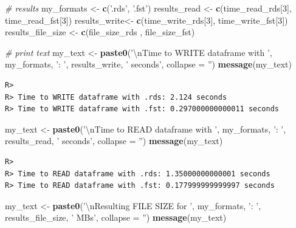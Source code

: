\documentclass[
  12pt,
]{book}
\newenvironment{Shaded}{\begin{snugshade}}{\end{snugshade}}
\newcommand{\CharTok}[1]{\textcolor[rgb]{0.5,0.5,0.5}{#1}}
\newcommand{\CommentTok}[1]{\textcolor[rgb]{0.37,0.37,0.37}{\textit{#1}}}
\newcommand{\DataTypeTok}[1]{\textcolor[rgb]{0.27,0.27,0.27}{#1}}
\newcommand{\DecValTok}[1]{\textcolor[rgb]{0.06,0.06,0.06}{#1}}
\newcommand{\KeywordTok}[1]{\textcolor[rgb]{0.27,0.27,0.27}{\textbf{#1}}}
\newcommand{\NormalTok}[1]{#1}
\newcommand{\StringTok}[1]{\textcolor[rgb]{0.5,0.5,0.5}{#1}}
\begin{document}
\begin{Shaded}
\begin{Highlighting}[]
\CommentTok{# results}
\NormalTok{my_formats <-}\StringTok{ }\KeywordTok{c}\NormalTok{(}\StringTok{'.rds'}\NormalTok{, }\StringTok{'.fst'}\NormalTok{)}
\NormalTok{results_read <-}\StringTok{ }\KeywordTok{c}\NormalTok{(time_read_rds[}\DecValTok{3}\NormalTok{], time_read_fst[}\DecValTok{3}\NormalTok{])}
\NormalTok{results_write<-}\StringTok{ }\KeywordTok{c}\NormalTok{(time_write_rds[}\DecValTok{3}\NormalTok{], time_write_fst[}\DecValTok{3}\NormalTok{])}
\NormalTok{results_file_size <-}\StringTok{ }\KeywordTok{c}\NormalTok{(file_size_rds , file_size_fst)}

\CommentTok{# print text}
\NormalTok{my_text <-}\StringTok{ }\KeywordTok{paste0}\NormalTok{(}\StringTok{'}\CharTok{\textbackslash{}n}\StringTok{Time to WRITE dataframe with '}\NormalTok{,}
\NormalTok{                  my_formats, }\StringTok{': '}\NormalTok{,}
\NormalTok{                  results_write, }\StringTok{' seconds'}\NormalTok{, }\DataTypeTok{collapse =} \StringTok{''}\NormalTok{)}
\KeywordTok{message}\NormalTok{(my_text)}
\end{Highlighting}
\end{Shaded}

\begin{verbatim}
R> 
R> Time to WRITE dataframe with .rds: 2.124 seconds
R> Time to WRITE dataframe with .fst: 0.297000000000011 seconds
\end{verbatim}

\begin{Shaded}
\begin{Highlighting}[]
\NormalTok{my_text <-}\StringTok{ }\KeywordTok{paste0}\NormalTok{(}\StringTok{'}\CharTok{\textbackslash{}n}\StringTok{Time to READ dataframe with '}\NormalTok{,}
\NormalTok{                  my_formats, }\StringTok{': '}\NormalTok{,}
\NormalTok{                  results_read, }\StringTok{' seconds'}\NormalTok{, }\DataTypeTok{collapse =} \StringTok{''}\NormalTok{)}
\KeywordTok{message}\NormalTok{(my_text)}
\end{Highlighting}
\end{Shaded}

\begin{verbatim}
R> 
R> Time to READ dataframe with .rds: 1.35000000000001 seconds
R> Time to READ dataframe with .fst: 0.177999999999997 seconds
\end{verbatim}

\begin{Shaded}
\begin{Highlighting}[]
\NormalTok{my_text <-}\StringTok{ }\KeywordTok{paste0}\NormalTok{(}\StringTok{'}\CharTok{\textbackslash{}n}\StringTok{Resulting FILE SIZE for '}\NormalTok{,}
\NormalTok{                  my_formats, }\StringTok{': '}\NormalTok{,}
\NormalTok{                  results_file_size, }\StringTok{' MBs'}\NormalTok{, }\DataTypeTok{collapse =} \StringTok{''}\NormalTok{)}
\KeywordTok{message}\NormalTok{(my_text)}
\end{Highlighting}
\end{Shaded}
\end{document}
